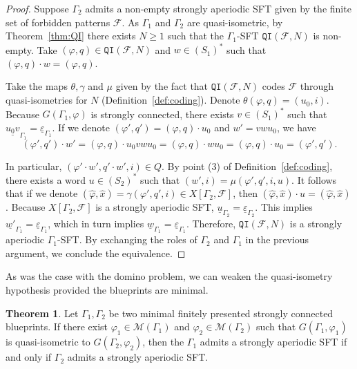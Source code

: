 \documentclass{article}
\theoremstyle{definition}
\newtheorem{theorem}{Theorem}[section] %
\theoremstyle{definition}
\newcommand{\M}{\mathcal{M}}
\newcommand{\Fo}{\mathcal{F}}
\newcommand{\QI}{\mathtt{QI}}
\begin{document}
\begin{proof}
Suppose $\Gamma_2$ admits a non-empty strongly aperiodic SFT given by the finite set of forbidden patterns $\Fo$. As $\Gamma_1$ and $\Gamma_2$ are quasi-isometric, by Theorem~\ref{thm:QI} there exists $N\geq 1$ such that the $\Gamma_1$-SFT $\QI(\Fo, N)$ is non-empty. Take $(\varphi,q)\in\QI(\Fo, N)$ and $w\in (S_1)^*$ such that $(\varphi,q)\cdot w = (\varphi, q)$.

Take the maps $\theta, \gamma$ and $\mu$ given by the fact that $\QI(\Fo, N)$ codes $\Fo$ through quasi-isometries for $N$ (Definition~\ref{def:coding}). Denote $\theta(\varphi, q) = (u_0, i)$. Because $G(\Gamma_1, \varphi)$ is strongly connected, there exists $v\in (S_1)^*$ such that $\underline{u_0v}_{\Gamma_1} = \underline{\varepsilon}_{\Gamma_1}$. If we denote $(\varphi',q') = (\varphi, q)\cdot u_0$ and $w'= vwu_0$, we have
\[  (\varphi', q')\cdot w' = (\varphi, q) \cdot u_0vwu_0 = (\varphi,q)\cdot wu_0 = (\varphi,q)\cdot u_0 = (\varphi',q').\]

In particular, $(\varphi'\cdot w',q'\cdot w',i) \in Q$. By point (3) of Definition~\ref{def:coding}, there exists a word $u\in(S_2)^*$ such that $(w',i) = \mu(\varphi',q',i,u)$. It follows that if we denote $(\widehat{\varphi},\widehat{x}) = \gamma(\varphi',q',i)\in X[\Gamma_2,\Fo]$, then $(\widehat{\varphi},\widehat{x})\cdot u = (\widehat{\varphi},\widehat{x})$. Because $X[\Gamma_2,\Fo]$ is a strongly aperiodic SFT, $\underline{u}_{\Gamma_2} = \underline{\varepsilon}_{\Gamma_2}$. This implies $\underline{w'}_{\Gamma_1} = \underline{\varepsilon}_{\Gamma_1}$, which in turn implies $\underline{w}_{\Gamma_1} = \underline{\varepsilon}_{\Gamma_1}$. Therefore, $\QI(\Fo,N)$ is a strongly aperiodic $\Gamma_1$-SFT. By exchanging the roles of $\Gamma_2$ and $\Gamma_1$ in the previous argument, we conclude the equivalence.
\end{proof}

As was the case with the domino problem, we can weaken the quasi-isometry hypothesis provided the blueprints are minimal.

\begin{theorem}\label{thm:SA_v2}
    Let $\Gamma_1, \Gamma_2$ be two minimal finitely presented strongly connected blueprints. If there exist $\varphi_1\in\M(\Gamma_1)$ and $\varphi_2\in\M(\Gamma_2)$ such that $G(\Gamma_1, \varphi_1)$ is quasi-isometric to $G(\Gamma_2,\varphi_2)$, then the $\Gamma_1$ admits a strongly aperiodic SFT if and only if $\Gamma_2$ admits a strongly aperiodic SFT.
\end{theorem}
\end{document}
